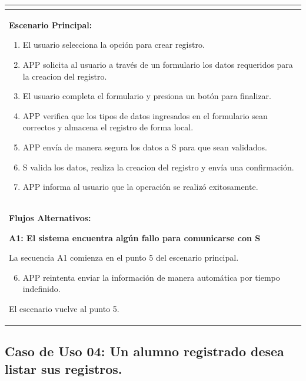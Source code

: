 \begin{longtable}{|l|p{5.5cm}|l|p{2cm}|l|p{1.9cm}|}
{    } \\ \hline

    \multicolumn{6}{|p{15cm}|}{ \textbf{Escenario Principal: }

    \begin{enumerate}
        \item El usuario selecciona la opción para crear registro.
        \item APP solicita al usuario a través de un formulario los datos requeridos para la creacion del registro.
        \item El usuario completa el formulario y presiona un botón para finalizar.
        \item APP verifica que los tipos de datos ingresados en el formulario sean correctos y almacena el registro de forma local.
        \item APP envía de manera segura los datos a S para que sean validados.
        \item S valida los datos, realiza la creacion del registro y envía una confirmación.
        \item APP informa al usuario que la operación se realizó exitosamente.
    \end{enumerate}

    } \\ \hline

    \multicolumn{6}{|p{15cm}|}{ \textbf{Flujos Alternativos: }

    \textbf{A1: El sistema encuentra algún fallo para comunicarse con S}
    
    La secuencia A1 comienza en el punto 5 del escenario principal.
    \begin{enumerate}
        \setcounter{enumi}{5}
        \item APP reintenta enviar la información de manera automática por tiempo indefinido.
    \end{enumerate}

    El escenario vuelve al punto 5.

    } \\ \hline

\end{longtable}


\subsection{Caso de Uso 04: Un alumno registrado desea listar sus registros.}

